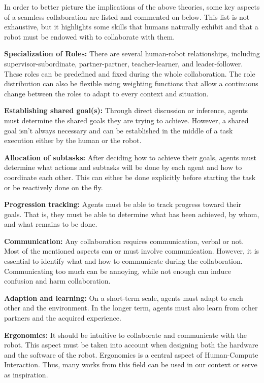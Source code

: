 
In order to better picture the implications of the above theories, some key aspects of a seamless collaboration are listed and commented on below. This list is not exhaustive, but it highlights some skills that humans naturally exhibit and that a robot must be endowed with to collaborate with them. 

\textbf{Specialization of Roles:} There are several human-robot relationships, including supervisor-subordinate, partner-partner, teacher-learner, and leader-follower. These roles can be predefined and fixed during the whole collaboration. The role distribution can also be flexible using weighting functions that allow a continuous change between the roles to adapt to every context and situation.

\textbf{Establishing shared goal(s):} Through direct discussion or inference, agents must determine the shared goals they are trying to achieve. However, a shared goal isn't always necessary and can be established in the middle of a task execution either by the human or the robot.

\textbf{Allocation of subtasks:} After deciding how to achieve their goals, agents must determine what actions and subtasks will be done by each agent and how to coordinate each other. This can either be done explicitly before starting the task or be reactively done on the fly.

\textbf{Progression tracking:} Agents must be able to track progress toward their goals. That is, they must be able to determine what has been achieved, by whom, and what remains to be done. 

\textbf{Communication:} Any collaboration requires communication, verbal or not. Most of the mentioned aspects can or must involve communication. However, it is essential to identify what and how to communicate during the collaboration. Communicating too much can be annoying, while not enough can induce confusion and harm collaboration.

\textbf{Adaption and learning:} On a short-term scale, agents must adapt to each other and the environment. In the longer term, agents must also learn from other partners and the acquired experience.

\textbf{Ergonomics:} It should be intuitive to collaborate and communicate with the robot. This aspect must be taken into account when designing both the hardware and the software of the robot. Ergonomics is a central aspect of Human-Compute Interaction. Thus, many works from this field can be used in our context or serve as inspiration.

